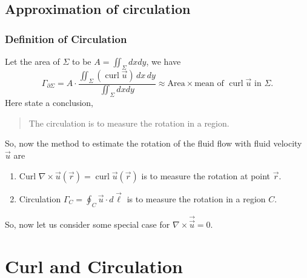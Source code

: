 \documentclass[11pt,]{beamer}
\begin{document}
\subsection{Approximation of circulation}
\begin{frame}
\frametitle{Definition of Circulation}
	Let the area of $\Sigma$ to be $\displaystyle A = \iint_{\Sigma} dxdy$, we have 
	\begin{equation}
	\Gamma_{\partial \Sigma} = A \cdot \frac{\displaystyle\iint_{\Sigma} \left(\operatorname{curl}	\vec{u}\right)\,dx\,dy}{\displaystyle\iint_{\Sigma} dxdy}
	\approx \text{Area}\times\text{mean of $\operatorname{curl}\vec{u}$ in $\Sigma$.}
	\end{equation}
	Here state a conclusion,
	\begin{quote}
	\bigskip
	The circulation is to measure the rotation in a region.
	\end{quote}

\end{frame}
\begin{frame}
	So, now the method to estimate the rotation of the fluid flow with fluid velocity $\vec{u}$ are 
	\begin{enumerate}
	\item Curl $\nabla \times \vec{u}(\vec{r}) = \operatorname{curl}\vec{u}(\vec{r})$ is to measure the rotation at point $\vec{r}$.
	\item Circulation $\displaystyle \Gamma_{C} = \oint_{C}\vec{u}\cdot d\vec{\ell}$ is to measure the rotation in a region $C$.
	\end{enumerate}
	So, now let us consider some special case for $\nabla\times\vec{\vec{u}}=0$. 
\end{frame}
\section{Curl and Circulation}
\end{document}
